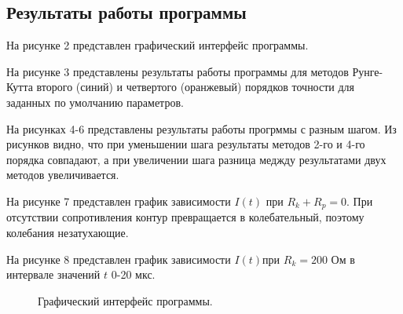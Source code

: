 \documentclass[a4paper,14pt]{article}
\begin{document}
\subsection*{Результаты работы программы}

На рисунке 2 представлен графический интерфейс программы.

На рисунке 3 представлены результаты работы программы для методов Рунге-Кутта второго (синий) и четвертого (оранжевый) порядков точности для заданных по умолчанию параметров.

На рисунках 4-6 представлены результаты работы прогрммы с разным шагом. Из рисунков видно, что при уменьшении шага результаты методов 2-го и 4-го порядка совпадают, а при увеличении шага разница меджду результатами двух методов увеличивается. 

На рисунке 7 представлен график зависимости $I(t) $ при $R_k + R_p = 0$. При отсутствии сопротивления контур превращается в колебательный, поэтому колебания незатухающие.

На рисунке 8 представлен график зависимости $I(t) $при $R_k = 200$ Ом в интервале  значений $t$ 0-20 мкс.


\newpage

\begin{figure}[!h]
\caption{Графический интерфейс программы.}
\label{fig:image}
\end{figure}
\end{document}
